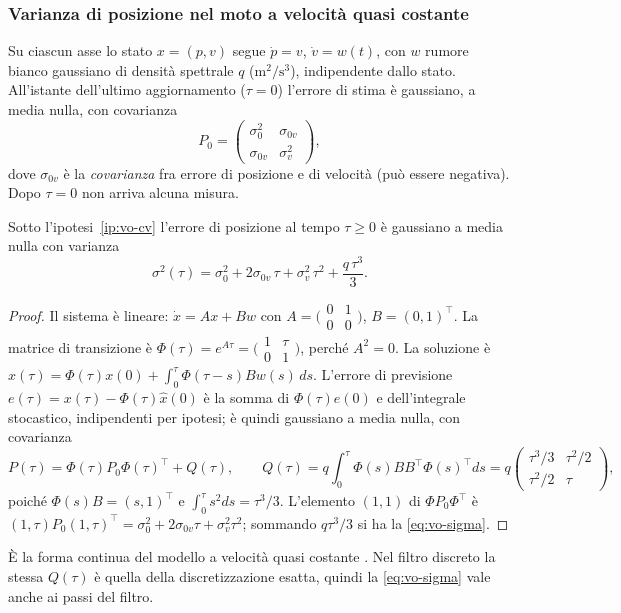 \subsubsection{Varianza di posizione nel moto a velocità quasi costante}\label{sec:vo-c-modello}

\begin{ipotesi}\label{ip:vo-cv}
Su ciascun asse lo stato $x=(p,v)$ segue $\dot p=v$, $\dot v=w(t)$, con $w$ rumore bianco gaussiano di densità spettrale $q$ ($\mathrm{m^2/s^3}$), indipendente dallo stato. All'istante dell'ultimo aggiornamento ($\tau=0$) l'errore di stima è gaussiano, a media nulla, con covarianza
\[P_0=\begin{pmatrix}\sigma_0^2 & \sigma_{0v}\\ \sigma_{0v} & \sigma_v^2\end{pmatrix},\]
dove $\sigma_{0v}$ è la \emph{covarianza} fra errore di posizione e di velocità (può essere negativa). Dopo $\tau=0$ non arriva alcuna misura.
\end{ipotesi}

\begin{proposizione}\label{prop:vo-sigma}
Sotto l'ipotesi~\ref{ip:vo-cv} l'errore di posizione al tempo $\tau\ge0$ è gaussiano a media nulla con varianza
\begin{equation}\label{eq:vo-sigma}
\sigma^2(\tau)=\sigma_0^2+2\sigma_{0v}\,\tau+\sigma_v^2\,\tau^2+\frac{q\,\tau^3}{3}.
\end{equation}
\end{proposizione}
\begin{proof}
Il sistema è lineare: $\dot x=Ax+Bw$ con $A=\bigl(\begin{smallmatrix}0&1\\0&0\end{smallmatrix}\bigr)$, $B=(0,1)^\top$. La matrice di transizione è $\Phi(\tau)=e^{A\tau}=\bigl(\begin{smallmatrix}1&\tau\\0&1\end{smallmatrix}\bigr)$, perché $A^2=0$. La soluzione è $x(\tau)=\Phi(\tau)x(0)+\int_0^\tau\Phi(\tau-s)Bw(s)\,ds$. L'errore di previsione $e(\tau)=x(\tau)-\Phi(\tau)\hat x(0)$ è la somma di $\Phi(\tau)e(0)$ e dell'integrale stocastico, indipendenti per ipotesi; è quindi gaussiano a media nulla, con covarianza
\[P(\tau)=\Phi(\tau)P_0\Phi(\tau)^\top+Q(\tau),\qquad Q(\tau)=q\int_0^\tau\Phi(s)BB^\top\Phi(s)^\top ds=q\begin{pmatrix}\tau^3/3&\tau^2/2\\ \tau^2/2&\tau\end{pmatrix},\]
poiché $\Phi(s)B=(s,1)^\top$ e $\int_0^\tau s^2ds=\tau^3/3$. L'elemento $(1,1)$ di $\Phi P_0\Phi^\top$ è $(1,\tau)P_0(1,\tau)^\top=\sigma_0^2+2\sigma_{0v}\tau+\sigma_v^2\tau^2$; sommando $q\tau^3/3$ si ha la \eqref{eq:vo-sigma}.
\end{proof}
È la forma continua del modello a velocità quasi costante \cite{barshalom2001}. Nel filtro discreto la stessa $Q(\tau)$ è quella della discretizzazione esatta, quindi la \eqref{eq:vo-sigma} vale anche ai passi del filtro.

